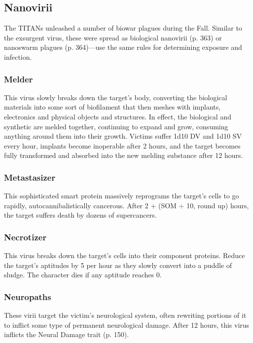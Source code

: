 \subsection{Nanovirii}

The TITANs unleashed a number of biowar plagues 
during the Fall. Similar to the exsurgent virus, these 
were spread as biological nanovirii (p. 363) or nanoswarm
plagues (p. 364)—use the same rules for determining
exposure and infection.

\subsubsection{Melder}

This virus slowly breaks down the target's body, 
converting the biological materials into some sort of 
biofilament that then meshes with implants, electronics
and physical objects and structures. In effect, the
biological and synthetic are melded together, continuing
to expand and grow, consuming anything around
them into their growth. Victims suffer 1d10 DV and 
1d10 SV every hour, implants become inoperable after 
2 hours, and the target becomes fully transformed 
and absorbed into the new melding substance after 
12 hours. 

\subsubsection{Metastasizer}

This sophisticated smart protein massively reprograms 
the target's cells to go rapidly, autocannibalistically 
cancerous. After 2 + (SOM $\div$ 10, round up) hours, the 
target suffers death by dozens of supercancers.

\subsubsection{Necrotizer}

This virus breaks down the target's cells into their 
component proteins. Reduce the target's aptitudes by 
5 per hour as they slowly convert into a puddle of 
sludge. The character dies if any aptitude reaches 0.

\subsubsection{Neuropaths}

These virii target the victim's neurological system, 
often rewriting portions of it to inflict some type of 
permanent neurological damage. After 12 hours, this 
virus inflicts the Neural Damage trait (p. 150).

